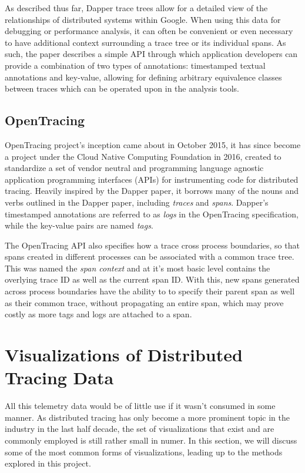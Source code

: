 \documentclass[pdftex,titlepage]{article}
\begin{document}
        As described thus far, Dapper trace trees allow for a detailed view of the relationships of distributed systems within
        Google. When using this data for debugging or performance analysis, it can often be convenient or even necessary to 
        have additional context surrounding a trace tree or its individual spans. As such, the paper describes a simple API 
        through which application developers can provide a combination of two types of annotations: timestamped textual annotations
        and key-value, allowing for defining arbitrary equivalence classes between traces which can be operated upon in the analysis
        tools.

        \subsection{OpenTracing}
        OpenTracing\cite{opentracing} project's inception came about in October 2015, it has since become a project under the 
        Cloud Native Computing Foundation in 2016, created to standardize a set of vendor neutral and programming language agnostic
        application programming interfaces (APIs) for instrumenting code for distributed tracing. Heavily inspired by the Dapper
        paper, it borrows many of the nouns and verbs outlined in the Dapper paper, including \textit{traces} and \textit{spans}.
        Dapper's timestamped annotations are referred to as \textit{logs} in the OpenTracing specification, while the key-value pairs
        are named \textit{tags}. 

        The OpenTracing API also specifies how a trace cross process boundaries, so that spans created in different processes can be
        associated with a common trace tree. This was named the \textit{span context} and at it's most basic level contains the 
        overlying trace ID as well as the current span ID. With this, new spans generated across process boundaries have the ability to
        to specify their parent span as well as their common trace, without propagating an entire span, which may prove costly as more
        tags and logs are attached to a span.
        
    \section{Visualizations of Distributed Tracing Data}
    All this telemetry data would be of little use if it wasn't consumed in some manner. As distributed tracing has only become a more
    prominent topic in the industry in the last half decade, the set of visualizations that exist and are commonly employed is still rather
    small in numer. In this section, we will discuss some of the most common forms of visualizations, leading up to the methods explored 
    in this project.
    
\end{document}

